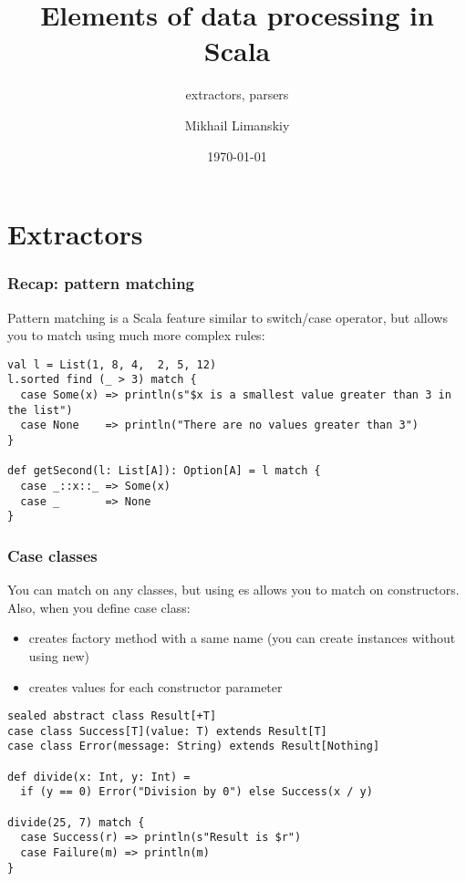 \documentclass[t]{beamer}
\title{Elements of data processing in Scala}
\subtitle{extractors, parsers}
\author{Mikhail Limanskiy}
\institute{SymphonyTeleca}
\date{\today}
\begin{document}
\begin{frame}
    \titlepage
\end{frame}

\section{Extractors}

\begin{frame}[fragile]
\frametitle{Recap: pattern matching}
Pattern matching is a Scala feature similar to switch/case operator, but allows you to match
using much more complex rules:
\begin{example}
\begin{lstlisting}
val l = List(1, 8, 4,  2, 5, 12)
l.sorted find (_ > 3) match {
  case Some(x) => println(s"$x is a smallest value greater than 3 in the list")
  case None    => println("There are no values greater than 3")
}

def getSecond(l: List[A]): Option[A] = l match {
  case _::x::_ => Some(x)
  case _       => None
}
\end{lstlisting}
\end{example}
\end{frame}

\begin{frame}[fragile]
\frametitle{Case classes}
You can match on any classes, but using es allows you to match on constructors.
Also, when you define case class:
\begin{itemize}
\item creates factory method with a same name (you can create instances without using new)
\item creates values for each constructor parameter
\end{itemize}
\begin{example}
\begin{lstlisting}
sealed abstract class Result[+T]
case class Success[T](value: T) extends Result[T]
case class Error(message: String) extends Result[Nothing]

def divide(x: Int, y: Int) =
  if (y == 0) Error("Division by 0") else Success(x / y)

divide(25, 7) match {
  case Success(r) => println(s"Result is $r")
  case Failure(m) => println(m)
}
\end{lstlisting}
\end{example}
\end{frame}
\end{document}
